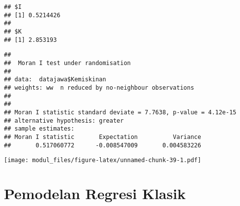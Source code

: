 \documentclass[
]{book}
\newenvironment{Shaded}{\begin{snugshade}}{\end{snugshade}}
\newcommand{\DataTypeTok}[1]{\textcolor[rgb]{0.13,0.29,0.53}{#1}}
\newcommand{\KeywordTok}[1]{\textcolor[rgb]{0.13,0.29,0.53}{\textbf{#1}}}
\newcommand{\NormalTok}[1]{#1}
\newcommand{\OperatorTok}[1]{\textcolor[rgb]{0.81,0.36,0.00}{\textbf{#1}}}
\newcommand{\StringTok}[1]{\textcolor[rgb]{0.31,0.60,0.02}{#1}}
\begin{document}
\begin{Shaded}
\end{Shaded}

\begin{verbatim}
## $I
## [1] 0.5214426
## 
## $K
## [1] 2.853193
\end{verbatim}

\begin{Shaded}
\end{Shaded}

\begin{verbatim}
## 
##  Moran I test under randomisation
## 
## data:  datajawa$Kemiskinan  
## weights: ww  n reduced by no-neighbour observations
##   
## 
## Moran I statistic standard deviate = 7.7638, p-value = 4.12e-15
## alternative hypothesis: greater
## sample estimates:
## Moran I statistic       Expectation          Variance 
##       0.517060772      -0.008547009       0.004583226
\end{verbatim}

\begin{Shaded}
\end{Shaded}

\texttt{[image: modul\_files/figure-latex/unnamed-chunk-39-1.pdf]}

\hypertarget{pemodelan-regresi-klasik}{%
\section{Pemodelan Regresi Klasik}\label{pemodelan-regresi-klasik}}
\end{document}

